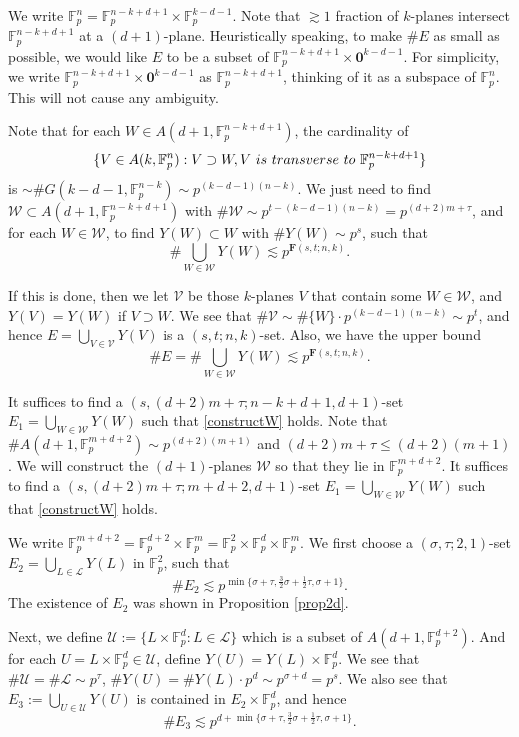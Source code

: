 \documentclass[10pt]{article}
\newcommand{\cL}{\mathcal{L}}
\newcommand{\cU}{\mathcal{U}}
\newcommand{\cV}{\mathcal{V}}
\newcommand{\cW}{\mathcal{W}}
\newcommand{\bF}{\mathbf{F}}
\newcommand{\F}{\mathbb F}
\newcommand{\Fp}{\mathbb{F}_p}
\newcommand{\si}{\sigma}
\newcommand{\bzz}{\mathbf{0}}
\begin{document}
We write $\Fp^n=\Fp^{n-k+d+1}\times \F_p^{k-d-1}$. Note that $\gtrsim 1$ fraction of $k$-planes intersect $\Fp^{n-k+d+1}$ at a $(d+1)$-plane. Heuristically speaking, to make $\#E$ as small as possible, we would like $E$ to be a subset of $\F_p^{n-k+d+1}\times \bzz^{k-d-1}$. For simplicity, we write $\F_p^{n-k+d+1}\times \bzz^{k-d-1}$ as $\Fp^{n-k+d+1}$, thinking of it as a subspace of $\Fp^n$. This will not cause any ambiguity.

Note that for each $W\in A(d+1,\F_p^{n-k+d+1})$, the cardinality of 
\[\{V\in A(k,\Fp^n): V\supset W,  V \textup{~is~transverse~to~} \F_p^{n-k+d+1} \}\] 
is $\sim \#G(k-d-1,\Fp^{n-k})\sim p^{(k-d-1)(n-k)}$. We just need to find $\cW\subset A(d+1,\F_p^{n-k+d+1})$ with $\#\cW\sim p^{t-(k-d-1)(n-k)}=p^{(d+2)m+\tau}$, and for each $W\in\cW$, to find $Y(W)\subset W$ with $\#Y(W)\sim p^{s}$, such that
\begin{equation}\label{constructW}
    \#\bigcup_{W\in\cW} Y(W)\lesssim p^{\bF(s,t;n,k)}.
\end{equation}

If this is done, then we let $\cV$ be those $k$-planes $V$ that contain some $W\in\cW$, and $Y(V)=Y(W)$ if $V\supset W$. We see that $\#\cV\sim \#\{W\}\cdot p^{(k-d-1)(n-k)}\sim p^t$, and hence $E=\bigcup_{V\in\cV} Y(V)$ is a $(s,t;n,k)$-set. Also, we have the upper bound
\[ \#E=\#\bigcup_{W\in\cW} Y(W)\lesssim p^{\bF(s,t;n,k)}. \]

It suffices to find a $(s,(d+2)m+\tau;n-k+d+1,d+1)$-set $E_1=\bigcup_{W\in\cW} Y(W)$ such that \eqref{constructW} holds. 
Note that $\#A(d+1,\Fp^{m+d+2})\sim p^{(d+2)(m+1)}$ and $(d+2)m+\tau\le (d+2)(m+1)$. We will construct the $(d+1)$-planes $\cW$ so that they lie in $\Fp^{m+d+2}$. 
It suffices to find a $(s,(d+2)m+\tau;m+d+2,d+1)$-set $E_1=\bigcup_{W\in\cW} Y(W)$ such that \eqref{constructW} holds.

We write $\Fp^{m+d+2}=\Fp^{d+2}\times\Fp^{m}=\Fp^2\times \Fp^d\times \Fp^m$. We first choose a $(\si,\tau;2,1)$-set $E_2=\bigcup_{L\in\cL}Y(L)$ in $\Fp^2$, such that
\[\#E_2\lesssim p^{\min\{\si+\tau,\frac32\si+\frac12\tau,\si+1\}}. \]
The existence of $E_2$ was shown in Proposition \ref{prop2d}.

Next, we define $\cU:=\{L\times \Fp^d: L\in\cL\}$ which is a subset of $A(d+1,\Fp^{d+2})$. And for each $U=L\times \Fp^d\in\cU$, define $Y(U)=Y(L)\times \Fp^d$. We see that $\#\cU= \#\cL\sim p^\tau$, $\#Y(U)=\#Y(L)\cdot p^d\sim p^{\si+d}=p^s$. We also see that $E_3:=\bigcup_{U\in \cU}Y(U)$ is contained in $E_2\times \Fp^d$, and hence \[\#E_3\lesssim p^{d+\min\{\si+\tau,\frac32\si+\frac12\tau,\si+1\}}.\]
\end{document}
